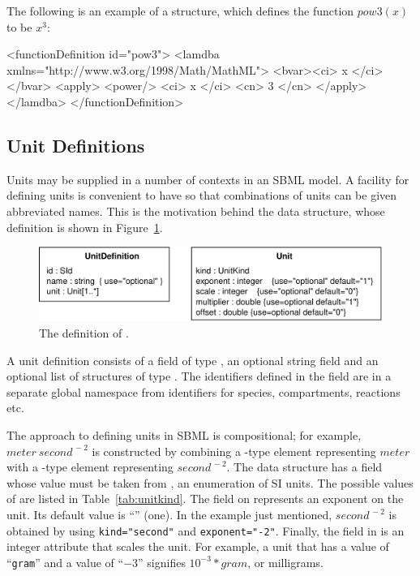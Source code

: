 \documentclass[10pt]{cekarticle}
\newcommand{\vref}[1]{\ref{#1}}
\begin{document}
The following is an example of a  structure,
which defines the function $pow3(x)$ to be $x^{3}$:

\begin{example}
<functionDefinition id="pow3">
    <lamdba xmlns="http://www.w3.org/1998/Math/MathML">
        <bvar><ci> x </ci></bvar>
        <apply>
            <power/>
            <ci> x </ci>
            <cn> 3 </cn>
        </apply>
    </lamdba>
</functionDefinition>
\end{example}

\subsection{Unit Definitions}
\label{sec:unitdefinitions}

Units may be supplied in a number of contexts in an SBML model.  A
facility for defining units is convenient to have so that
combinations of units can be given abbreviated names.  This is the
motivation behind the  data structure, whose
definition is shown in Figure~\vref{fig:unitdefinition}.

\begin{figure}[htb]
  \centering
  \includegraphics[scale = 0.68]{unitdefinition}
  \caption{The definition of .}
  \label{fig:unitdefinition}
\end{figure}

A unit definition consists of a  field of type
, an optional string field  and an
optional list of structures of type . The identifiers
defined in the  field are in a separate global
namespace from identifiers for species, compartments, reactions
etc.

The approach to defining units in SBML is compositional; for
example, $meter\ second^{\,-2}$ is constructed by combining a
-type element representing $meter$ with a
-type element representing $second^{\,-2}$.  The
 data structure has a  field whose value
must be taken from , an enumeration of SI units.
The possible values of  are listed in
Table~\vref{tab:unitkind}.  The  field on
 represents an exponent on the unit.  Its default
value is ``'' (one).  In the example just
mentioned, $second^{\,-2}$ is obtained by using
\texttt{kind="second"} and \texttt{exponent="-2"}. Finally, the
 field in  is an integer attribute that
scales the unit.  For example, a unit that has a 
value of ``\texttt{gram}'' and a  value of
``\texttt{$-3$}'' signifies $10^{-3} * gram$, or milligrams.
\end{document}

